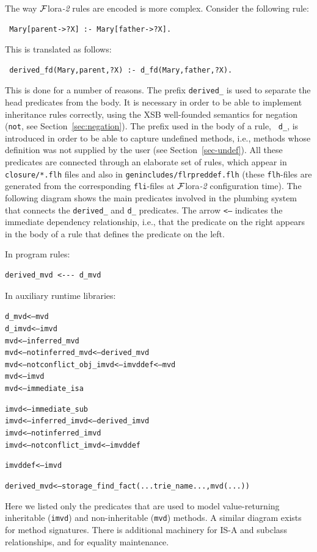 \documentclass[11pt]{article}
\newcommand{\FLORA}{{\mbox{\sc ${\cal F}${lora}\rm\emph{-2}}}\xspace}
\newcommand{\TNOT}{{{\tt not}}\xspace}
\begin{document}
The way \FLORA rules are encoded is more complex. Consider the following rule:
\begin{verbatim}
 Mary[parent->?X] :- Mary[father->?X].  
\end{verbatim}
This is translated as follows:
\begin{verbatim}
 derived_fd(Mary,parent,?X) :- d_fd(Mary,father,?X).  
\end{verbatim}
This is done for a number of reasons. The prefix {\tt derived\_} is used to
separate the head predicates from the body. It is necessary in order to
be able to implement inheritance rules correctly, using the XSB
well-founded semantics for negation (\TNOT, see
Section~\ref{sec:negation}). The prefix used in the body of a rule, {\tt
  d\_}, is introduced in order to be able to capture undefined methods,
i.e., methods whose definition was not supplied by the user (see
Section~\ref{sec-undef}). All these predicates are connected through an
elaborate set of rules, which appear in {\tt closure/*.flh} files and also
in {\tt genincludes/flrpreddef.flh} (these {\tt flh}-files are generated
from the corresponding {\tt fli}-files at \FLORA configuration time).
The following diagram shows the main
predicates involved in the plumbing system that connects
the {\tt derived\_} and {\tt d\_} predicates. The arrow {\tt <---} indicates the
immediate dependency relationship, i.e., that the predicate on the
right appears in the body of a rule that defines the predicate on the left.

\noindent
In program rules:
\begin{verbatim}
derived_mvd <--- d_mvd  
\end{verbatim}
\noindent
In auxiliary runtime libraries:
\begin{alltt}
d_mvd  <---  mvd
d_imvd <--- imvd
          mvd <---      inferred_mvd
          mvd <--- \TNOT inferred_mvd      <--- derived_mvd
          mvd <--- \TNOT conflict_obj_imvd                     <--- imvddef <--- mvd
          mvd <---      imvd
          mvd <---      immediate_isa

         imvd <---      immediate_sub
         imvd <---      inferred_imvd     <--- derived_imvd
         imvd <--- \TNOT inferred_imvd
         imvd <--- \TNOT conflict_imvd                         <--- imvddef

      imvddef <---      imvd

  derived_mvd <--- storage_find_fact(...trie_name..., mvd(...))
\end{alltt}
Here we listed only the predicates that are used to model value-returning
inheritable ({\tt imvd}) and non-inheritable ({\tt mvd}) methods.  A similar
diagram exists for
method signatures. There is additional machinery for
IS-A and subclass relationships, and for equality maintenance.
\end{document}
